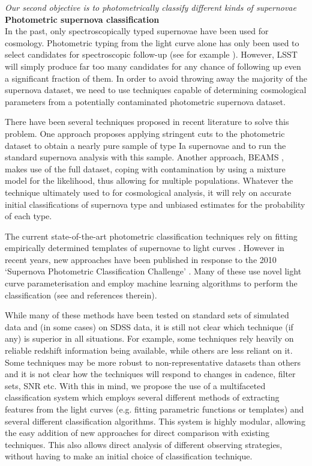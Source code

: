 {\emph{Our second objective is to photometrically classify different kinds of supernovae}} 
{\bfseries Photometric supernova classification}\\
In the past, only spectroscopically typed supernovae have been used for cosmology. Photometric 
typing from the light curve alone has only been used to select candidates for spectroscopic 
follow-up (see for example \citet{Sako2008}). However, LSST will simply produce far too many 
candidates for any chance of following up even a significant fraction of them. In order to avoid 
throwing away the majority of the supernova dataset, we need to use techniques capable of 
determining cosmological parameters from a potentially contaminated photometric supernova dataset.

There have been several techniques proposed in recent literature to solve this problem. One 
approach proposes applying stringent cuts to the photometric dataset to obtain a nearly pure sample 
of type Ia supernovae \citep{Bernstein2012,Campbell2013} and to run the standard supernova analysis 
with this sample. Another approach, BEAMS \citep{Kunz2007,Newling2011,Hlozek2012,Knights2013}, 
makes use of the full dataset, coping with contamination by using a mixture model for the 
likelihood, thus allowing for multiple populations. Whatever the technique ultimately used to for 
cosmological analysis, it will rely on accurate initial classifications of supernova type and 
unbiased estimates for the probability of each type.

The current state-of-the-art photometric classification techniques rely on fitting empirically 
determined templates of supernovae to light curves \citep{Jha2007,Guy2007,Sako2011}. However in 
recent years, new approaches have been published in response to the 2010 `Supernova 
Photometric Classification Challenge' \citep{Kessler2010a}. Many of these use novel light curve 
parameterisation and employ machine learning algorithms to perform the classification (see \citet{Kessler2010b} and references therein).

While many of these methods have been tested on standard sets of simulated data and (in some cases) 
on SDSS data, it is still not clear which technique (if any) is superior in all situations. For 
example, some techniques rely heavily on reliable redshift information being available, while others 
are less reliant on it. Some techniques may be more robust to non-representative datasets than 
others and it is not clear how the techniques will respond to changes in cadence, filter sets, SNR 
etc. With this in mind, we propose the use of a multifaceted classification system which employs 
several different methods of extracting features from the light curves (e.g. fitting parametric 
functions or templates) and several different classification algorithms. This system is highly 
modular, allowing the easy addition of new approaches for direct comparison with existing  techniques. This also allows direct analysis of different observing strategies, without having to 
make an initial choice of classification technique. 


